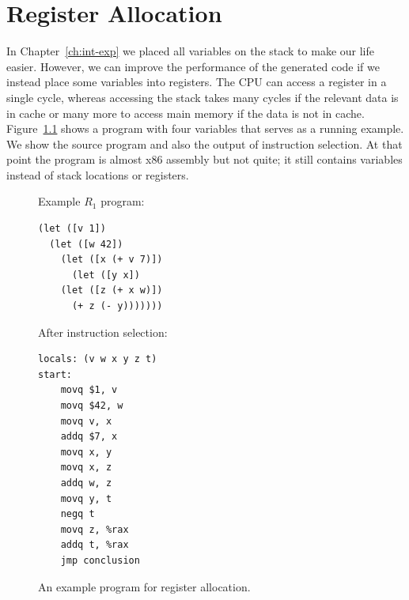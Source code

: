 \documentclass[11pt]{book}
\begin{document}
\chapter{Register Allocation}
\label{ch:register-allocation-r1}

In Chapter~\ref{ch:int-exp} we placed all variables on the stack to
make our life easier. However, we can improve the performance of the
generated code if we instead place some variables into registers.  The
CPU can access a register in a single cycle, whereas accessing the
stack takes many cycles if the relevant data is in cache or many more
to access main memory if the data is not in cache.
Figure~\ref{fig:reg-eg} shows a program with four variables that
serves as a running example. We show the source program and also the
output of instruction selection. At that point the program is almost
x86 assembly but not quite; it still contains variables instead of
stack locations or registers.

\begin{figure}
\begin{minipage}{0.45\textwidth}
Example $R_1$ program:
\begin{lstlisting}
(let ([v 1])
  (let ([w 42])
    (let ([x (+ v 7)])
      (let ([y x])
	(let ([z (+ x w)])
	  (+ z (- y)))))))
\end{lstlisting}
\end{minipage}
\begin{minipage}{0.45\textwidth}
After instruction selection:
\begin{lstlisting}
locals: (v w x y z t)
start:
    movq $1, v
    movq $42, w
    movq v, x
    addq $7, x
    movq x, y
    movq x, z
    addq w, z
    movq y, t
    negq t
    movq z, %rax
    addq t, %rax
    jmp conclusion
\end{lstlisting}
\end{minipage}
\caption{An example program for register allocation.}
\label{fig:reg-eg}
\end{figure}
\end{document}
